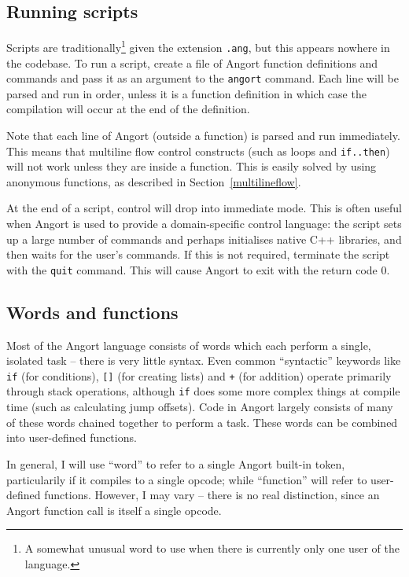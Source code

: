 \subsection{Running scripts}
Scripts are traditionally\footnote{A somewhat unusual word to use when
there is currently only one user of the language.} given the extension
\texttt{.ang}, but this appears nowhere in the codebase. To run a script,
create a file of Angort function definitions and commands and pass it as
an argument to the \texttt{angort} command. Each line will be parsed
and run in order, unless it is a function definition in which case the
compilation will occur at the end of the definition.

Note that each line of Angort (outside a function) is parsed and run
immediately. This means that multiline flow control constructs (such as loops
and \texttt{if..then}) will not work unless they are inside a function.
This is easily solved by using anonymous functions, as described in Section~\ref{multilineflow}.

At the end of a script, control will drop into immediate mode. This is often useful
when Angort is used to provide a domain-specific control language: the script sets up
a large number of commands and perhaps initialises native C++ libraries, and then
waits for the user's commands. If this is not required, terminate the script with
the \texttt{quit} command. This will cause Angort to exit with the return code 0.

\subsection{Words and functions}
Most of the Angort language consists of words which each perform
a single, isolated task -- there is very little syntax. Even common
``syntactic'' keywords like \texttt{if} (for conditions), \texttt{[]} 
(for creating lists) and \texttt{+} (for addition) operate primarily through
stack operations, although \texttt{if} does some more complex things at compile time
(such as calculating jump offsets). Code in Angort largely consists of many of these words
chained together to perform a task. These words can be combined into user-defined
functions.

In general, I will use ``word'' to refer to a single Angort built-in token,
particularily if it compiles to a single opcode; while ``function'' will refer
to user-defined functions. However, I may vary -- there is no real distinction, since
an Angort function call is itself a single opcode.

